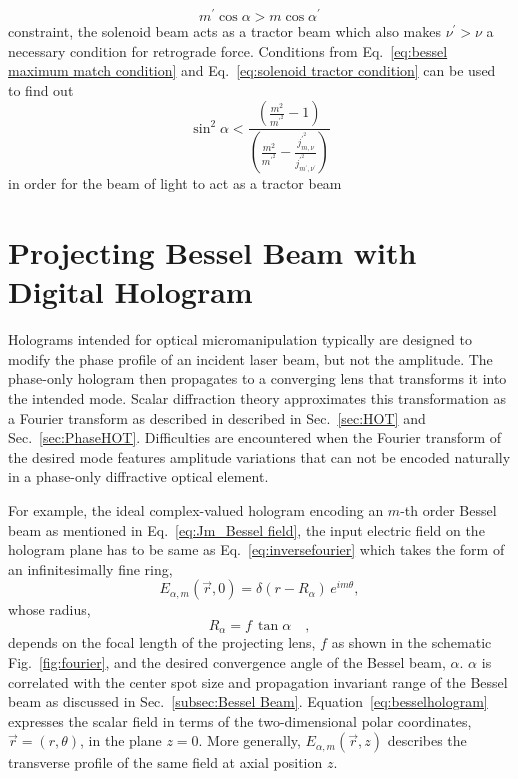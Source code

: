 \begin{equation}
\label{eq:solenoid tractor condition}
m^{\prime}\cos \alpha > m \cos \alpha ^{\prime}
\end{equation}
constraint, the solenoid beam acts as a tractor beam which also makes $\nu^{\prime} > \nu$ a necessary condition for retrograde force. Conditions from Eq.~\eqref{eq:bessel maximum match condition} and Eq.~\eqref{eq:solenoid tractor condition} can be used to find out
\begin{equation}
\label{eq:convergence angle limit}
\sin ^{2} \alpha < \frac{\left(\frac{m^2}{m^{\prime ^{2}}}-1\right)}{\left(\frac{m^2}{m^{\prime ^{2}}} - \frac{j_{m,\nu}^{\prime ^{2}}}{j^{\prime ^{2}}_{m^{\prime},\nu ^{\prime}}}\right)}
\end{equation}
 in order for the beam of light to act as a tractor beam






\section{Projecting Bessel Beam with \\ Digital Hologram}
\label{sec:Project Bessel Hologram}

Holograms intended for optical micromanipulation typically are designed to modify the phase profile of an incident laser beam, but not the amplitude. The phase-only hologram then propagates to a converging lens that transforms it into the intended mode. Scalar diffraction theory approximates this transformation as a Fourier transform \cite{goodman05} as described in described in Sec.~\ref{sec:HOT} and Sec.~\ref{sec:PhaseHOT}. Difficulties are encountered when the Fourier transform of the desired mode features amplitude variations that can not be encoded naturally in a phase-only diffractive optical element.

For example, the ideal complex-valued hologram encoding 
an $m$-th order Bessel beam as mentioned in Eq.~\eqref{eq:Jm_Bessel field}, the input electric field on the hologram plane has to be same as Eq.~\eqref{eq:inversefourier} which takes the form of an infinitesimally fine ring,
\begin{equation}
  \label{eq:besselhologram}
  E_{\alpha,m}(\vec{r},0)
  =
  \delta(r - R_\alpha) \, e^{i m\theta},
\end{equation}
whose radius, 
\begin{equation}
\label{eq:Ralpha}
R_{\alpha} = f \, \tan \alpha \quad ,
\end{equation}
depends on the focal length of the projecting lens, $f$ as shown in the schematic Fig.~\ref{fig:fourier}, and the desired convergence angle of the Bessel beam, $\alpha$. $\alpha$ is correlated with the center spot size and propagation invariant range of the Bessel beam as discussed in Sec.~\ref{subsec:Bessel Beam}.
Equation~\eqref{eq:besselhologram} expresses the
scalar field in terms of the two-dimensional
polar coordinates, $\vec{r} = (r,\theta)$, in the plane $z = 0$.
More generally, $E_{\alpha,m}(\vec{r},z)$ describes the
transverse profile of the same field at axial position $z$.

